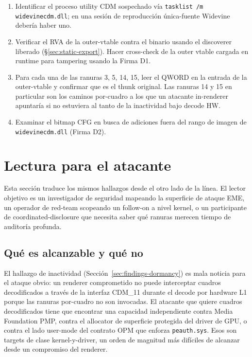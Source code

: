 \documentclass[11pt,letterpaper]{article}
\let\oldsection\section
\renewcommand{\section}{\clearpage\oldsection}
\begin{document}
\begin{enumerate}[itemsep=2pt]
  \item Identificar el proceso utility CDM sospechado vía
        \texttt{tasklist /m widevinecdm.dll}; en una sesión de
        reproducción única-fuente Widevine debería haber uno.
  \item Verificar el RVA de la outer-vtable contra el binario
        usando el discoverer liberado
        (\S\ref{sec:static-export}). Hacer cross-check de la
        outer vtable cargada en runtime para tampering usando
        la Firma D1.
  \item Para cada una de las ranuras 3, 5, 14, 15, leer el
        QWORD en la entrada de la outer-vtable y confirmar que
        es el thunk original. Las ranuras 14 y 15 en particular
        son los caminos por-cuadro a los que un atacante
        in-renderer apuntaría si no estuviera al tanto de la
        inactividad bajo decode HW.
  \item Examinar el bitmap CFG en busca de adiciones fuera del
        rango de imagen de \texttt{widevinecdm.dll} (Firma D2).
\end{enumerate}

\section{Lectura para el atacante}
\label{sec:attacker}

Esta sección traduce los mismos hallazgos desde el otro lado de
la línea. El lector objetivo es un investigador de seguridad mapeando
la superficie de ataque EME, un operador de red-team scopeando un
follow-on a nivel kernel, o un participante de coordinated-disclosure
que necesita saber qué ranuras merecen tiempo de auditoría profunda.

\subsection{Qué es alcanzable y qué no}

El hallazgo de inactividad
(Sección~\ref{sec:findings-dormancy}) es mala noticia para el
ataque obvio: un renderer comprometido no puede interceptar
cuadros decodificados a través de la interfaz CDM\_11 durante el
decode por hardware L1 porque las ranuras por-cuadro no son
invocadas. El atacante que quiere cuadros decodificados tiene
que encontrar una capacidad independiente contra Media Foundation
PMP, contra el allocator de superficie protegida del driver de
GPU, o contra el lado user-mode del contrato OPM que enforza
\texttt{peauth.sys}. Esos son targets de clase
kernel-y-driver, un orden de magnitud más difíciles de alcanzar
desde un compromiso del renderer.
\end{document}

